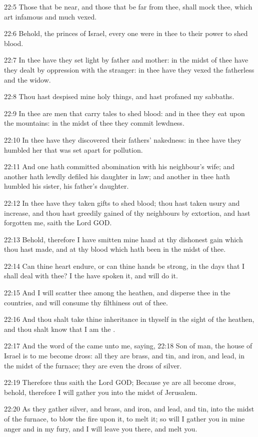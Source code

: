 22:5 Those that be near, and those that be far from thee, shall mock
thee, which art infamous and much vexed.

22:6 Behold, the princes of Israel, every one were in thee to their
power to shed blood.

22:7 In thee have they set light by father and mother: in the midst of
thee have they dealt by oppression with the stranger: in thee have
they vexed the fatherless and the widow.

22:8 Thou hast despised mine holy things, and hast profaned my
sabbaths.

22:9 In thee are men that carry tales to shed blood: and in thee they
eat upon the mountains: in the midst of thee they commit lewdness.

22:10 In thee have they discovered their fathers' nakedness: in thee
have they humbled her that was set apart for pollution.

22:11 And one hath committed abomination with his neighbour's wife;
and another hath lewdly defiled his daughter in law; and another in
thee hath humbled his sister, his father's daughter.

22:12 In thee have they taken gifts to shed blood; thou hast taken
usury and increase, and thou hast greedily gained of thy neighbours by
extortion, and hast forgotten me, saith the Lord GOD.

22:13 Behold, therefore I have smitten mine hand at thy dishonest gain
which thou hast made, and at thy blood which hath been in the midst of
thee.

22:14 Can thine heart endure, or can thine hands be strong, in the
days that I shall deal with thee? I the \LORD have spoken it, and will
do it.

22:15 And I will scatter thee among the heathen, and disperse thee in
the countries, and will consume thy filthiness out of thee.

22:16 And thou shalt take thine inheritance in thyself in the sight of
the heathen, and thou shalt know that I am the \LORD.

22:17 And the word of the \LORD came unto me, saying, 22:18 Son of man,
the house of Israel is to me become dross: all they are brass, and
tin, and iron, and lead, in the midst of the furnace; they are even
the dross of silver.

22:19 Therefore thus saith the Lord GOD; Because ye are all become
dross, behold, therefore I will gather you into the midst of
Jerusalem.

22:20 As they gather silver, and brass, and iron, and lead, and tin,
into the midst of the furnace, to blow the fire upon it, to melt it;
so will I gather you in mine anger and in my fury, and I will leave
you there, and melt you.

